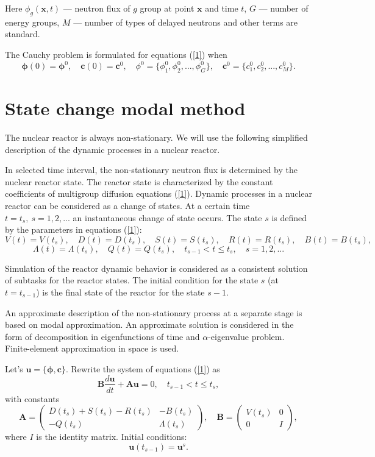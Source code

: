 \documentclass[a4paper]{jpconf}
\begin{document}
Here $\phi_g(\bm x,t)$ --- neutron flux of $g$ group at point $\bm x$ and time $t$,
$G$ --- number of energy groups, 
$M$ --- number of types of delayed neutrons 
and other terms are standard.

The Cauchy problem is formulated for equations (\ref{1})  when 
\begin{equation}\label{3}
 \bm \phi(0) = \bm \phi^0,
 \quad   \bm c(0) = \bm c^0,
 \quad   \phi^0 = \{ \phi_1^0,  \phi_2^0, ...,  \phi_G^0 \},  
 \quad   \bm c^0 = \{c_1^0, c_2^0, ..., c_M^0\}.
\end{equation} 

\section{State change modal method}
The nuclear reactor is always non-stationary. We will use the following simplified description of the dynamic processes in a nuclear reactor.

In selected time interval, the non-stationary neutron flux is determined by the nuclear reactor state. The reactor state is characterized by the constant coefficients of multigroup diffusion equations (\ref{1}). Dynamic processes in a nuclear reactor can be considered as a change of states. 
At a certain time $t = t_s, \ s = 1,2, ...$ an instantaneous change of state occurs. The state $s$ is defined by the parameters in equations  (\ref{1}):
\[
 V(t) = V(t_s), \quad  D(t) = D(t_s), \quad  S(t) = S(t_s), \quad  R(t) = R(t_s), \quad  B(t) = B(t_s),
\] 
\[
 \Lambda(t) = \Lambda(t_s), \quad  Q(t) = Q(t_s),
 \quad t_{s-1} < t \leq t_s, \quad s = 1,2, ... 
\] 

Simulation of the reactor dynamic behavior is considered as a consistent solution of subtasks for the reactor states. The initial condition for the state $s$ (at $t = t_{s-1}$) is the final state of the reactor for the state $s-1$.

An approximate description of the non-stationary process at a separate stage is based on modal approximation. An approximate solution is considered in the form of decomposition in eigenfunctions of time and $\alpha$-eigenvalue problem. Finite-element approximation in space is used.

Let's $\bm u = \{\bm \phi, \bm c\}$. Rewrite the system of equations (\ref{1}) as
\begin{equation}\label{4}
 \bm B \frac{d \bm u}{d t} + \bm A \bm u = 0,
 \quad t_{s-1} < t \leq t_s,
\end{equation} 
with constants
\[
 \bm A = 
 \begin{pmatrix}
 D(t_s)+S(t_s) - R(t_s) &  - B(t_s) \\
 - Q(t_s) & \Lambda(t_s) 
 \end{pmatrix} ,
 \quad  \bm B = 
 \begin{pmatrix}
 V(t_s) & 0 \\
 0 & I 
 \end{pmatrix} ,
\] 
where $I$ is the identity matrix. Initial conditions:
\begin{equation}\label{5}
 \bm u(t_{s-1}) = \bm u^s .
\end{equation} 
\end{document}
